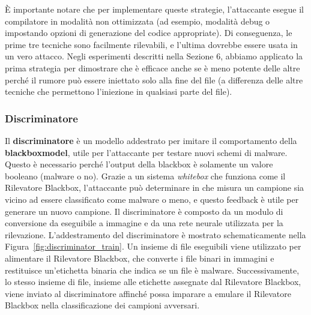 È importante notare che per implementare queste strategie, l'attaccante esegue il compilatore in modalità non ottimizzata (ad esempio, modalità debug o impostando opzioni di generazione del codice appropriate). Di conseguenza, le prime tre tecniche sono facilmente rilevabili, e l'ultima dovrebbe essere usata in un vero attacco. Negli esperimenti descritti nella Sezione 6, abbiamo applicato la prima strategia per dimostrare che è efficace anche se è meno potente delle altre perché il rumore può essere iniettato solo alla fine del file (a differenza delle altre tecniche che permettono l'iniezione in qualsiasi parte del file).

\subsubsection{Discriminatore}
Il \textbf{discriminatore} è un modello addestrato per imitare il comportamento della \textbf{\gls{blackboxmodel}}, utile per l'attaccante per testare nuovi schemi di malware. Questo è necessario perché l'output della blackbox è solamente un valore booleano (malware o no). Grazie a un sistema \textit{whitebox} che funziona come il Rilevatore Blackbox, l'attaccante può determinare in che misura un campione sia vicino ad essere classificato come malware o meno, e questo feedback è utile per generare un nuovo campione.
Il discriminatore è composto da un modulo di conversione da eseguibile a immagine e da una rete neurale utilizzata per la rilevazione. L'addestramento del discriminatore è mostrato schematicamente nella Figura~\ref{fig:discriminator_train}. Un insieme di file eseguibili viene utilizzato per alimentare il Rilevatore Blackbox, che converte i file binari in immagini e restituisce un'etichetta binaria che indica se un file è malware. Successivamente, lo stesso insieme di file, insieme alle etichette assegnate dal Rilevatore Blackbox, viene inviato al discriminatore affinché possa imparare a emulare il Rilevatore Blackbox nella classificazione dei campioni avversari.


